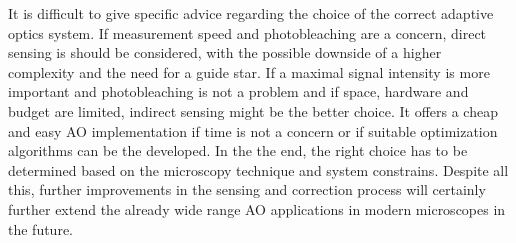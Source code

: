 \noindent It is difficult to give specific advice regarding the choice of the correct adaptive optics system. If measurement speed and photobleaching are a concern, direct sensing is should be considered, with the possible downside of a higher complexity and the need for a guide star. 
If a maximal signal intensity is more important and photobleaching is not a problem and if space, hardware and budget are limited, indirect sensing might be the better choice. It offers a cheap and easy AO implementation if time is not a concern or if suitable optimization algorithms can be the developed. In the the end, the right choice has to be  determined based on the microscopy technique and system constrains. Despite all this, further improvements in the sensing and correction process will certainly further extend the already wide range AO applications in modern microscopes in the future. 






